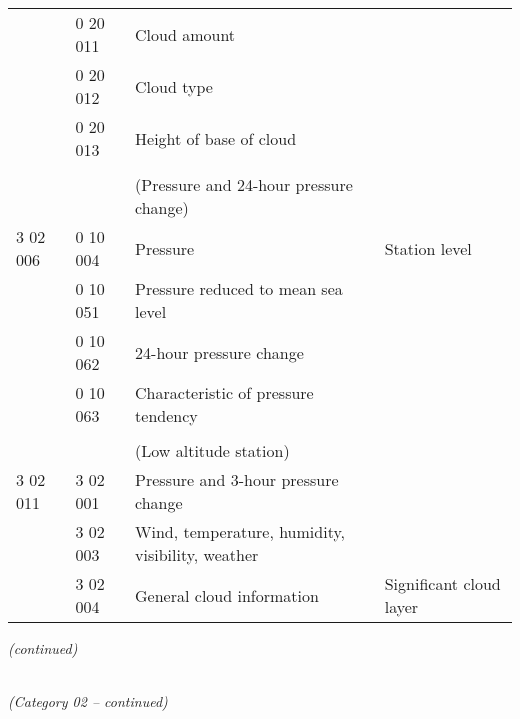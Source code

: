 \begin{longtable}[]{@{}llll@{}}
& 0 20 011 & Cloud amount &\tabularnewline
& 0 20 012 & Cloud type &\tabularnewline
& 0 20 013 & Height of base of cloud &\tabularnewline
& & &\tabularnewline
& & (Pressure and 24-hour pressure change) &\tabularnewline
3 02 006 & 0 10 004 & Pressure & Station level\tabularnewline
& 0 10 051 & Pressure reduced to mean sea level &\tabularnewline
& 0 10 062 & 24-hour pressure change &\tabularnewline
& 0 10 063 & Characteristic of pressure tendency &\tabularnewline
& & &\tabularnewline
& & (Low altitude station) &\tabularnewline
3 02 011 & 3 02 001 & Pressure and 3-hour pressure change &\tabularnewline
& 3 02 003 & Wind, temperature, humidity, visibility, weather &\tabularnewline
& 3 02 004 & General cloud information & Significant cloud layer\tabularnewline
\bottomrule
\end{longtable}

\emph{(continued)}

\emph{\\
(Category 02 -- continued)}

